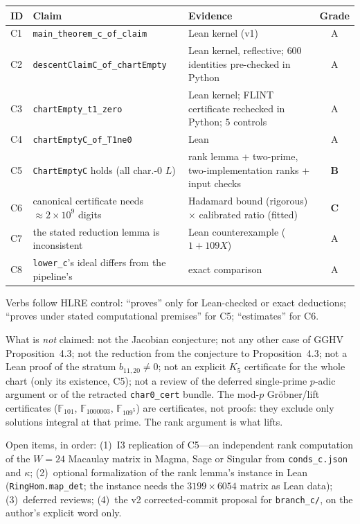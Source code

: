 \documentclass[a4paper,11pt]{article}
\theoremstyle{plain}
\theoremstyle{definition}
\theoremstyle{remark}
\begin{document}
{\small
\begin{center}
\begin{tabular}{llp{5.2cm}c}
\toprule
\textbf{ID} & \textbf{Claim} & \textbf{Evidence} & \textbf{Grade} \\
\midrule
C1 & \texttt{main\_theorem\_c\_of\_claim} & Lean kernel (v1) & A \\
C2 & \texttt{descentClaimC\_of\_chartEmpty} & Lean kernel, reflective; $600$ identities pre-checked in Python & A \\
C3 & \texttt{chartEmpty\_t1\_zero} & Lean kernel; FLINT certificate rechecked in Python; $5$ controls & A \\
C4 & \texttt{chartEmptyC\_of\_T1ne0} & Lean & A \\
C5 & \texttt{ChartEmptyC} holds (all char.-$0$ $L$) & rank lemma + two-prime, two-implementation ranks + input checks & \textbf{B} \\
C6 & canonical certificate needs $\approx2\times10^9$ digits & Hadamard bound (rigorous) $\times$ calibrated ratio (fitted) & \textbf{C} \\
C7 & the stated reduction lemma is inconsistent & Lean counterexample ($1+109X$) & A \\
C8 & \texttt{lower\_c}'s ideal differs from the pipeline's & exact comparison & A \\
\bottomrule
\end{tabular}
\end{center}
}
\label{tab:grades}

Verbs follow HLRE control: ``proves'' only for Lean-checked or exact deductions; ``proves under stated computational premises'' for C5; ``estimates'' for C6.

What is \emph{not} claimed: not the Jacobian conjecture; not any other case of GGHV Proposition~4.3; not the reduction from the conjecture to Proposition~4.3; not a Lean proof of the stratum $b_{11,20}\ne0$; not an explicit $K_5$ certificate for the whole chart (only its existence, C5); not a review of the deferred single-prime $p$-adic argument or of the retracted \texttt{char0\_cert} bundle. The mod-$p$ Gr\"obner/lift certificates ($\mathbb{F}_{101}$, $\mathbb{F}_{1000003}$, $\mathbb{F}_{109^5}$) are certificates, not proofs: they exclude only solutions integral at that prime. The rank argument is what lifts.

Open items, in order: (1)~I3 replication of C5---an independent rank computation of the $W=24$ Macaulay matrix in Magma, Sage or Singular from \texttt{conds\_c.json} and $\kappa$; (2)~optional formalization of the rank lemma's instance in Lean (\texttt{RingHom.map\_det}; the instance needs the $3199\times6054$ matrix as Lean data); (3)~deferred reviews; (4)~the v2 corrected-commit proposal for \texttt{branch\_c/}, on the author's explicit word only.
\end{document}
